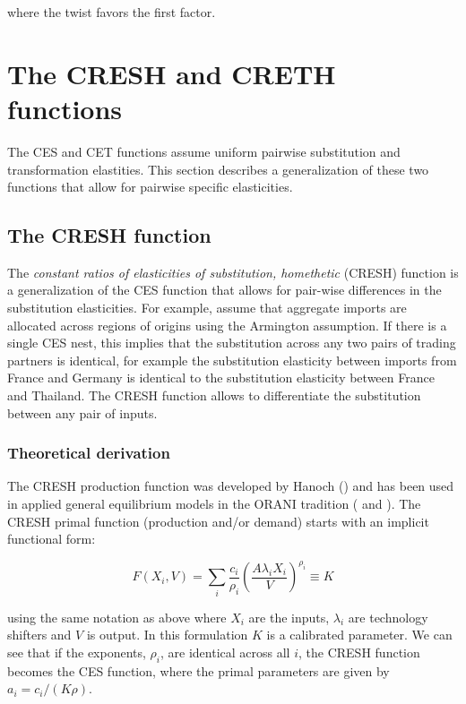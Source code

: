 \noindent where the twist favors the first factor.

\ifCESDetail

\section{The CRESH and CRETH functions}

The CES and CET functions assume uniform pairwise substitution and transformation
elastities. This section describes a generalization of these two functions
that allow for pairwise specific elasticities.

\subsection{The CRESH function}

The \emph{constant ratios of elasticities of substitution, homethetic} (CRESH) function is a
generalization of the CES function that allows for pair-wise
differences in the substitution elasticities. For example, assume that aggregate
imports are allocated across regions of origins using the Armington assumption. If there
is a single CES nest, this implies that the substitution across any two pairs of trading
partners is identical, for example the substitution elasticity between imports from France and Germany
is identical to the substitution elasticity between France and Thailand. The CRESH function
allows to differentiate the substitution between any pair of inputs.

\subsubsection{Theoretical derivation}
The CRESH production function was developed by Hanoch (\cite{Hanoch1971}) and has been used
in applied general equilibrium models in the ORANI tradition (\cite{Dixonetal1982} and \cite{DixonRimmer2002}).
The CRESH primal function (production and/or demand) starts with an implicit functional form:

\begin{equation}
\label{eq:creshprimal}
F(X_i,V) = \sum\limits_{i}{ \frac{c_i}{\rho_i}\left( \frac{A \lambda_i X_i}{V}\right)^{\rho_i}} \equiv K
\end{equation}

\noindent using the same notation as above where $X_i$ are the inputs, $\lambda_i$ are technology
shifters and $V$ is output. In this formulation $K$ is a calibrated parameter. We can
see that if the exponents, $\rho_i$, are identical across all $i$, the CRESH function becomes the CES
function, where the primal parameters are given by $a_i=c_i/(K \rho)$.

